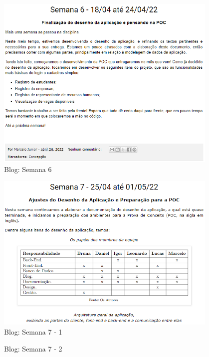 \begin{apendicesenv}
\begin{figure}[H]
\end{figure}
\begin{figure}[H]
	\centering
	\caption{Blog: Semana 6}
	\includegraphics[width=0.95\textwidth]{../imagens/blog-posts/semana06.png}
\end{figure}
\begin{figure}[H]
	\centering
	\caption{Blog: Semana 7 - 1}
	\includegraphics[width=0.95\textwidth]{../imagens/blog-posts/semana07-1.png}
\end{figure}
\begin{figure}[H]
	\centering
	\caption{Blog: Semana 7 - 2}

\end{figure}
\end{apendicesenv}
